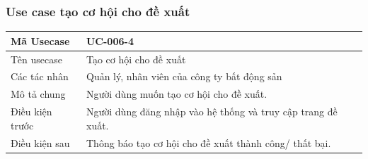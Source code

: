 \documentclass[12pt,a4paper]{article}
\begin{document}

    \subsubsection*{Use case tạo cơ hội cho đề xuất}
    \begin{table}[H]
        \centering
        \begin{tabular}{|p{3.5cm}|p{11.5cm}|c|}
            \hline
            Mã Usecase      & UC-006-4                                                     \\
            \hline
            Tên usecase     & Tạo cơ hội cho đề xuất                                       \\
            \hline
            Các tác nhân    & Quản lý, nhân viên của công ty bất động sản                  \\
            \hline
            Mô tả chung     & Người dùng muốn tạo cơ hội cho đề xuất.                      \\
            \hline

            Điều kiện trước & Người dùng đăng nhập vào hệ thống và truy cập trang đề xuất. \\
            \hline

            Điều kiện sau   & Thông báo tạo cơ hội cho đề xuất thành công/ thất bại.       \\
            \hline


\end{tabular}
\end{table}
\end{document}
